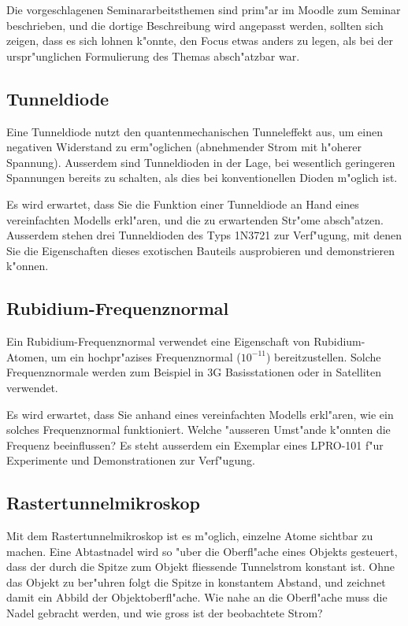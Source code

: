 Die vorgeschlagenen Seminararbeitsthemen sind prim"ar im Moodle zum
Seminar beschrieben, und die dortige Beschreibung wird angepasst
werden, sollten sich zeigen, dass es sich lohnen k"onnte, den Focus
etwas anders zu legen, als bei der urspr"unglichen Formulierung des
Themas absch"atzbar war.

\subsection{Tunneldiode}
Eine Tunneldiode nutzt den quantenmechanischen Tunneleffekt aus,
um einen negativen Widerstand zu erm"oglichen (abnehmender Strom mit
h"oherer Spannung). Ausserdem sind Tunneldioden in der Lage, bei
wesentlich geringeren Spannungen bereits zu schalten, als dies bei
konventionellen Dioden m"oglich ist.

Es wird erwartet, dass Sie die Funktion einer Tunneldiode an Hand
eines vereinfachten Modells erkl"aren, und die zu erwartenden Str"ome
absch"atzen. Ausserdem stehen drei Tunneldioden des Typs 1N3721 zur
Verf"ugung, mit denen Sie die Eigenschaften dieses exotischen Bauteils
ausprobieren und demonstrieren k"onnen.

\subsection{Rubidium-Frequenznormal}
Ein Rubidium-Frequenznormal verwendet eine Eigenschaft von
Rubidium-Atomen, um ein hochpr"azises Frequenznormal ($10^{-11}$)
bereitzustellen. Solche Frequenznormale werden zum Beispiel in 3G
Basisstationen oder in Satelliten verwendet.

Es wird erwartet, dass Sie anhand eines vereinfachten Modells
erkl"aren, wie ein solches Frequenznormal funktioniert. Welche
"ausseren Umst"ande k"onnten die Frequenz beeinflussen? Es steht
ausserdem ein Exemplar eines LPRO-101 f"ur Experimente und Demonstrationen
zur Verf"ugung.

\subsection{Rastertunnelmikroskop}
Mit dem Rastertunnelmikroskop ist es m"oglich, einzelne Atome sichtbar
zu machen. Eine Abtastnadel wird so "uber die Oberfl"ache eines Objekts
gesteuert, dass der durch die Spitze zum Objekt fliessende Tunnelstrom
konstant ist. Ohne das Objekt zu ber"uhren folgt die Spitze in
konstantem Abstand, und zeichnet damit ein Abbild der Objektoberfl"ache.
Wie nahe an die Oberfl"ache muss die Nadel gebracht werden, und wie
gross ist der beobachtete Strom?

